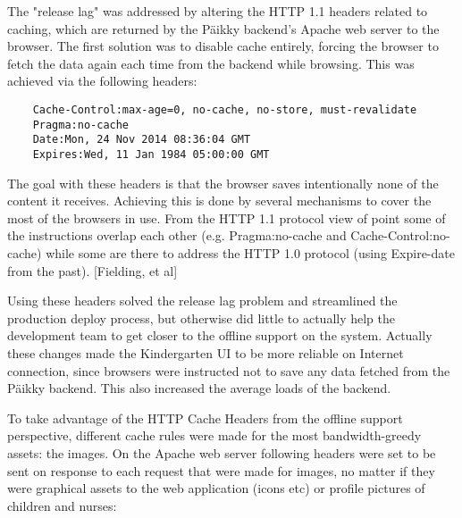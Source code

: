 The "release lag" was addressed by altering the HTTP 1.1 headers related to caching, which are returned by the Päikky backend's Apache web server to the browser. The first solution was to disable cache entirely, forcing the browser to fetch the data again each time from the backend while browsing. This was achieved via the following headers:
\begin{lstlisting}
    Cache-Control:max-age=0, no-cache, no-store, must-revalidate
    Pragma:no-cache
    Date:Mon, 24 Nov 2014 08:36:04 GMT
    Expires:Wed, 11 Jan 1984 05:00:00 GMT
\end{lstlisting}
\noindent The goal with these headers is that the browser saves intentionally none of the content it receives. Achieving this is done by several mechanisms to cover the most of the browsers in use. From the HTTP 1.1 protocol view of point some of the instructions overlap each other (e.g. Pragma:no-cache and Cache-Control:no-cache) while some are there to address the HTTP 1.0 protocol (using Expire-date from the past). [Fielding, et al]

Using these headers solved the release lag problem and streamlined the production deploy process, but otherwise did little to actually help the development team to get closer to the offline support on the system. Actually these changes made the Kindergarten UI to be more reliable on Internet connection, since browsers were instructed not to save any data fetched from the Päikky backend. This also increased the average loads of the backend.

To take advantage of the HTTP Cache Headers from the offline support perspective, different cache rules were made for the most bandwidth-greedy assets: the images. On the Apache web server following headers were set to be sent on response to each request that were made for images, no matter if they were graphical assets to the web application (icons etc) or profile pictures of children and nurses:

